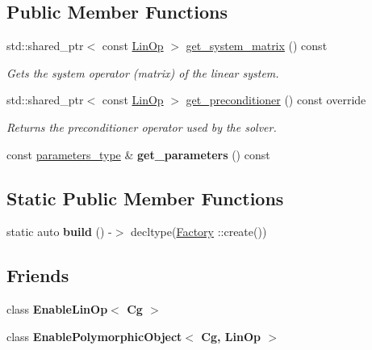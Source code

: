 \subsection*{Public Member Functions}
\begin{DoxyCompactItemize}
\item 
std\+::shared\+\_\+ptr$<$ const \hyperlink{classgko_1_1LinOp}{Lin\+Op} $>$ \hyperlink{classgko_1_1solver_1_1Cg_a09d50a99fdc668316757ee253386ad2a}{get\+\_\+system\+\_\+matrix} () const
\begin{DoxyCompactList}\small\item\em Gets the system operator (matrix) of the linear system. \end{DoxyCompactList}\item 
std\+::shared\+\_\+ptr$<$ const \hyperlink{classgko_1_1LinOp}{Lin\+Op} $>$ \hyperlink{classgko_1_1solver_1_1Cg_a797544ecc8d86d2798014e7f5f5baf4f}{get\+\_\+preconditioner} () const override
\begin{DoxyCompactList}\small\item\em Returns the preconditioner operator used by the solver. \end{DoxyCompactList}\item 
\mbox{\label{classgko_1_1solver_1_1Cg_a548b5ff27c59e50f78eb96a0463453ae}} 
const \hyperlink{structgko_1_1solver_1_1Cg_1_1parameters__type}{parameters\+\_\+type} \& {\bfseries get\+\_\+parameters} () const
\end{DoxyCompactItemize}
\subsection*{Static Public Member Functions}
\begin{DoxyCompactItemize}
\item 
\mbox{\label{classgko_1_1solver_1_1Cg_a3d16ac7e3132362573b9af81cbccdf69}} 
static auto {\bfseries build} () -\/$>$ decltype(\hyperlink{classgko_1_1solver_1_1Cg_1_1Factory}{Factory} \+::create())
\end{DoxyCompactItemize}
\subsection*{Friends}
\begin{DoxyCompactItemize}
\item 
\mbox{\label{classgko_1_1solver_1_1Cg_addd5cadb50dadd7e118776aeee9eb1c4}} 
class {\bfseries Enable\+Lin\+Op$<$ Cg $>$}
\item 
\mbox{\label{classgko_1_1solver_1_1Cg_a4a8963db94d0c3f4136daf08823c6b09}} 
class {\bfseries Enable\+Polymorphic\+Object$<$ Cg, Lin\+Op $>$}
\end{DoxyCompactItemize}


